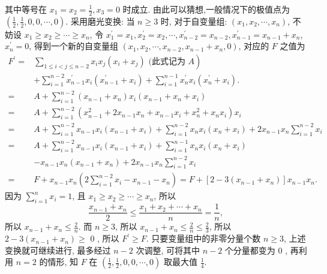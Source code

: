 其中等号在 $x_1=x_2=\frac{1}{2}, x_3=0$ 时成立.
由此可以猜想,一般情况下的极值点为 $\left(\frac{1}{2}, \frac{1}{2}, 0,0, \cdots, 0\right)$.
采用磨光变换: 当 $n \geqslant 3$ 时, 对于自变量组: $\left(x_1, x_2, \cdots, x_n\right)$, 不妨设 $x_1 \geqslant x_2 \geqslant \cdots \geqslant x_n$, 令 $x_1^{\prime}=x_1, x_2^{\prime}=x_2, \cdots, x_{n-2}^{\prime}=x_{n-2}, x_{n-1}^{\prime}=x_{n-1}+x_n$, $x_n^{\prime}=0$, 得到一个新的自变量组 $\left(x_1, x_2, \cdots, x_{n-2}, x_{n-1}+x_n, 0\right)$, 对应的 $F$ 之值为
$$
\begin{aligned}
F^{\prime}= & \left.\sum_{1 \leqslant i<j \leqslant n-2} x_i x_j\left(x_i+x_j\right) \text { (此式记为 } A\right) \\
& +\sum_{i=1}^{n-2} x_{n-1}^{\prime} x_i\left(x_{n-1}^{\prime}+x_i\right)+\sum_{i=1}^{n-1} x_n^{\prime} x_i\left(x_n^{\prime}+x_i\right) . \\
= & A+\sum_{i=1}^{n-2}\left(x_{n-1}+x_n\right) x_i\left(x_{n-1}+x_n+x_i\right) \\
= & A+\sum_{i=1}^{n-2}\left(x_{n-1}^2+2 x_{n-1} x_n+x_{n-1} x_i+x_n^2+x_n x_i\right) x_i \\
= & A+\sum_{i=1}^{n-2} x_{n-1} x_i\left(x_{n-1}+x_i\right)+\sum_{i=1}^{n-2} x_n x_i\left(x_n+x_i\right)+2 x_{n-1} x_n \sum_{i=1}^{n-2} x_i \\
= & A+\sum_{i=1}^{n-2} x_{n-1} x_i\left(x_{n-1}+x_i\right)+\sum_{i=1}^{n-1} x_n x_i\left(x_n+x_i\right) \\
& -x_{n-1} x_n\left(x_{n-1}+x_n\right)+2 x_{n-1} x_n \sum_{i=1}^{n-2} x_i \\
= & F+x_{n-1} x_n\left(2 \sum_{i=1}^{n-2} x_i-x_{n-1}-x_n\right)=F+\left[2-3\left(x_{n-1}+x_n\right)\right] x_{n-1} x_n .
\end{aligned}
$$
因为 $\sum_{i=1}^n x_i=1$, 且 $x_1 \geqslant x_2 \geqslant \cdots \geqslant x_n$, 所以
$$
\frac{x_{n-1}+x_n}{2} \leqslant \frac{x_1+x_2+\cdots+x_n}{n}=\frac{1}{n},
$$
所以 $x_{n-1}+x_n \leqslant \frac{2}{n}$. 而 $n \geqslant 3$, 所以 $x_{n-1}+x_n \leqslant \frac{2}{n} \leqslant \frac{2}{3}$, 所以 $2-3\left(x_{n-1}+x_n\right) \geqslant$ 0 , 所以 $F^{\prime} \geqslant F$.
只要变量组中的非零分量个数 $n \geqslant 3$, 上述变换就可继续进行, 最多经过 $n-2$ 次调整, 可将其中 $n-2$ 个分量都变为 0 , 再利用 $n=2$ 的情形, 知 $F$ 在 $\left(\frac{1}{2}, \frac{1}{2}, 0,0, \cdots, 0\right)$ 取最大值 $\frac{1}{4}$.



